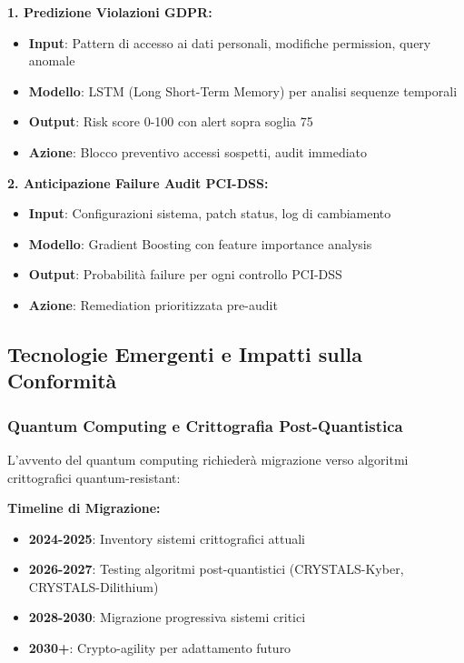 \textbf{1. Predizione Violazioni GDPR:}
\begin{itemize}
    \item \textbf{Input}: Pattern di accesso ai dati personali, modifiche permission, query anomale
    \item \textbf{Modello}: LSTM (Long Short-Term Memory) per analisi sequenze temporali
    \item \textbf{Output}: Risk score 0-100 con alert sopra soglia 75
    \item \textbf{Azione}: Blocco preventivo accessi sospetti, audit immediato
\end{itemize}

\textbf{2. Anticipazione Failure Audit PCI-DSS:}
\begin{itemize}
    \item \textbf{Input}: Configurazioni sistema, patch status, log di cambiamento
    \item \textbf{Modello}: Gradient Boosting con feature importance analysis
    \item \textbf{Output}: Probabilità failure per ogni controllo PCI-DSS
    \item \textbf{Azione}: Remediation prioritizzata pre-audit
\end{itemize}

\subsection{Tecnologie Emergenti e Impatti sulla Conformità}

\subsubsection{Quantum Computing e Crittografia Post-Quantistica}

L'avvento del quantum computing richiederà migrazione verso algoritmi crittografici quantum-resistant:

\textbf{Timeline di Migrazione:}
\begin{itemize}
    \item \textbf{2024-2025}: Inventory sistemi crittografici attuali
    \item \textbf{2026-2027}: Testing algoritmi post-quantistici (CRYSTALS-Kyber, CRYSTALS-Dilithium)
    \item \textbf{2028-2030}: Migrazione progressiva sistemi critici
    \item \textbf{2030+}: Crypto-agility per adattamento futuro
\end{itemize}

